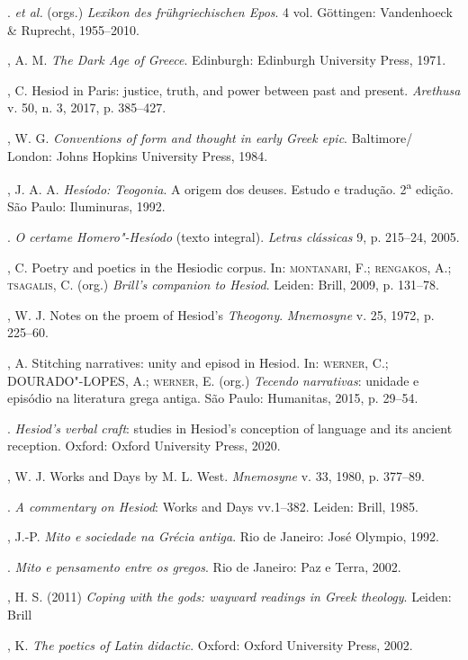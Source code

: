\begin{bibliohedra}
\titidem. \emph{et al.} (orgs.) \emph{Lexikon des frühgriechischen
Epos}. 4 vol. Göttingen: Vandenhoeck \& Ruprecht, 1955--2010.

, A. M. \emph{The Dark Age of Greece}. Edinburgh: Edinburgh
University Press, 1971.

, C. Hesiod in Paris: justice, truth, and power between past and
present. \emph{Arethusa} v. 50, n. 3, 2017, p. 385--427.

, W. G. \emph{Conventions of form and thought in early Greek
epic}. Baltimore/ London: Johns Hopkins University Press, 1984.

, J. A. A. \emph{Hesíodo: Teogonia}. A origem dos deuses. Estudo
e tradução. 2\textsuperscript{a} edição. São Paulo: Iluminuras, 1992.

\titidem. \emph{O certame Homero"-Hesíodo} (texto integral).
\emph{Letras clássicas} 9, p. 215--24, 2005.

, C. Poetry and poetics in the Hesiodic corpus. In: \textsc{montanari},
F.; \textsc{rengakos}, A.; \textsc{tsagalis}, C. (org.) \emph{Brill's companion to
Hesiod}. Leiden: Brill, 2009, p. 131--78.

, W. J. Notes on the proem of Hesiod's \emph{Theogony}.
\emph{Mnemosyne} v. 25, 1972, p. 225--60.

, A. Stitching narratives: unity and episod in Hesiod. In:
\textsc{werner}, C.; \textsc{DOURADO"-LOPES}, A.; \textsc{werner}, E. (org.) \emph{Tecendo
narrativas}: unidade e episódio na literatura grega antiga. São Paulo:
Humanitas, 2015, p. 29--54.

\titidem. \emph{Hesiod's verbal craft}: studies in Hesiod's conception of
language and its ancient reception. Oxford: Oxford University Press,
2020.

, W. J. Works and Days by M. L. West. \emph{Mnemosyne} v. 33,
1980, p. 377--89.

\titidem. \emph{A commentary on Hesiod}: Works and Days vv.1--382. Leiden:
Brill, 1985.

, J.-P. \emph{Mito e sociedade na Grécia antiga}. Rio de Janeiro:
José Olympio, 1992.

\titidem. \emph{Mito e pensamento entre os gregos}. Rio de Janeiro: Paz e
Terra, 2002.

, H. S. (2011) \emph{Coping with the gods: wayward readings in
Greek theology}. Leiden: Brill

, K. \emph{The poetics of Latin didactic}. Oxford: Oxford University
Press, 2002.


\end{bibliohedra}
